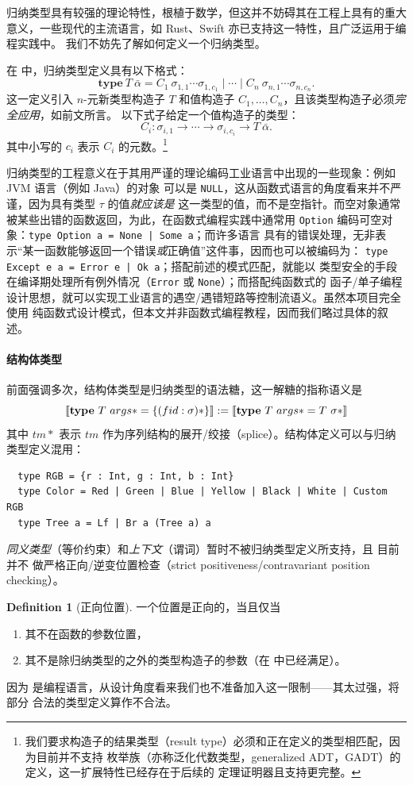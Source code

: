 \documentclass[a4paper, 11pt]{article}
\theoremstyle{remark}\newtheorem*{remark}{Remark}
\theoremstyle{definition}\newtheorem*{definition}{Definition}
\begin{document}
归纳类型具有较强的理论特性，根植于数学，但这并不妨碍其在工程上具有的重大意义，一些现代的主流语言，如
Rust、Swift 亦已支持这一特性，且广泛运用于编程实践中。
我们不妨先了解如何定义一个归纳类型。

在 \Tigris 中，归纳类型定义具有以下格式：
\[
  \mathbf{type}\ T\ \bar{\alpha} =
  C_1\ \sigma_{1,1}\cdots\sigma_{1,c_1}
  \mid\cdots
  \mid C_n\ \sigma_{n,1}\cdots\sigma_{n,c_n}.
\]
这一定义引入 $n$-元新类型构造子 $T$ 和值构造子 \(C_1,\dots,C_n\)，且该类型构造子必须\emph{完全应用}，如前文所言。
以下式子给定一个值构造子的类型：
\[
  C_i : \sigma_{i,1}\to\cdots\to\sigma_{i,c_i}\to T\ \bar{\alpha}.
\]
其中小写的 $c_i$ 表示 $C_i$ 的元数。\footnote{
  我们要求构造子的结果类型（result type）必须和正在定义的类型相匹配，因为目前并不支持
  枚举族（亦称泛化代数类型，generalized ADT，GADT）的定义，这一扩展特性已经存在于后续的
  \Tigrisd 定理证明器且支持更完整。
}

归纳类型的工程意义在于其用严谨的理论编码工业语言中出现的一些现象：例如 JVM 语言（例如 Java）的对象
可以是 \texttt{NULL}，这从函数式语言的角度看来并不严谨，因为具有类型 $\tau$ 的值\emph{就应该是}
这一类型的值，而不是空指针。而空对象通常被某些出错的函数返回，为此，在函数式编程实践中通常用
\texttt{Option} 编码可空对象：\texttt{type Option a = None | Some a}；而许多语言
具有的错误处理，无非表示“某一函数能够返回一个错误\emph{或}正确值”这件事，因而也可以被编码为：
\texttt{type Except e a = Error e | Ok a}；搭配前述的模式匹配，就能以
类型安全的手段在编译期处理所有例外情况（\texttt{Error} 或 \texttt{None}）；而搭配纯函数式的
函子/单子编程设计思想，就可以实现工业语言的遇空/遇错短路等控制流语义。虽然本项目完全使用
纯函数式设计模式，但本文并非函数式编程教程，因而我们略过具体的叙述。

\paragraph{结构体类型} 前面强调多次，结构体类型是归纳类型的语法糖，这一解糖的指称语义是
\[
  \llbracket \textbf{type}\ T\ args* = \{(fid : \sigma)*\} \rrbracket :=
  \llbracket \textbf{type}\ T\ args* = T\ \sigma* \rrbracket
\]
其中 $tm*$ 表示 $tm$ 作为序列结构的展开/绞接（splice）。结构体定义可以与归纳类型定义混用：
\begin{verbatim}
  type RGB = {r : Int, g : Int, b : Int}
  type Color = Red | Green | Blue | Yellow | Black | White | Custom RGB
  type Tree a = Lf | Br a (Tree a) a
\end{verbatim}
\emph{同义类型}（等价约束）和\emph{上下文}（谓词）暂时不被归纳类型定义所支持，且 \Tigris 目前并不
做严格正向/逆变位置检查（strict positiveness/contravariant position checking）。
\begin{definition}[正向位置]
  一个位置是正向的，当且仅当
  \begin{enumerate}
    \item 其不在函数的参数位置，
    \item 其不是除归纳类型的之外的类型构造子的参数（在 \Tigris 中已经满足）。
  \end{enumerate}
\end{definition}
因为 \Tigris 是编程语言，从设计角度看来我们也不准备加入这一限制——其太过强，将部分
合法的类型定义算作不合法。
\end{document}
